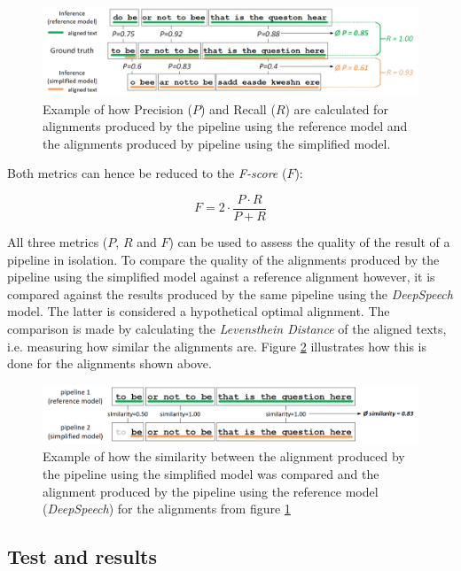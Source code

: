 \begin{figure}[h!]
	\includegraphics[width=\linewidth]{./img/precision_recall_fscore.png}
	\caption{Example of how Precision ($P$) and Recall ($R$) are calculated for alignments produced by the pipeline using the reference model and the alignments produced by pipeline using the simplified model.}
	\label{precision_recall_fscore}
\end{figure}

Both metrics can hence be reduced to the \textit{F-score} ($F$):

\[ 
F = 2\cdot \frac{P\cdot R}{P+R}
\]

All three metrics ($P$, $R$ and $F$) can be used to assess the quality of the result of a pipeline in isolation. To compare the quality of the alignments produced by the pipeline using the simplified model against a reference alignment however, it is compared against the results produced by the same pipeline using the \textit{DeepSpeech} model. The latter is considered a hypothetical optimal alignment. The comparison is made by calculating the \textit{Levensthein Distance} of the aligned texts, i.e. measuring how similar the alignments are. Figure \ref{alignment_similarity} illustrates how this is done for the alignments shown above.

\begin{figure}[h!]
	\includegraphics[width=\linewidth]{./img/alignment_similarity.png}
	\caption{Example of how the similarity between the alignment produced by the pipeline using the simplified model was compared and the alignment produced by the pipeline using the reference model (\textit{DeepSpeech}) for the alignments from figure \ref{precision_recall_fscore}}
	\label{alignment_similarity}
\end{figure}


\subsection{Test and results}

